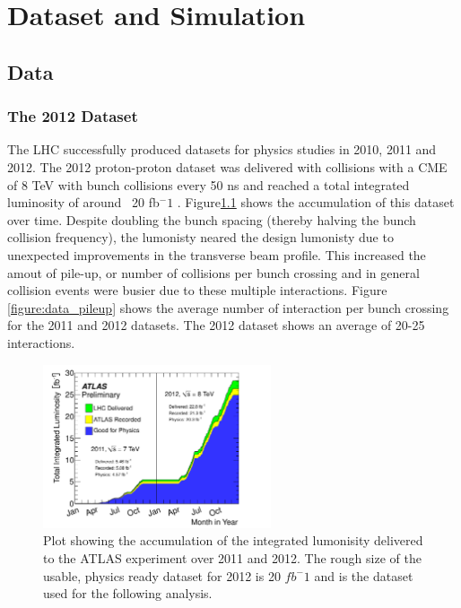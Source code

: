 \chapter[Dataset and Simulation][Dataset and Simulation]{Dataset and Simulation}

\section{Data}

\subsection{The 2012 Dataset} 

The LHC successfully produced datasets for physics studies in 2010, 2011 and 2012. The 2012 
proton-proton dataset was delivered with collisions with a CME of 8 TeV with bunch collisions
every 50 ns and reached a total integrated luminosity of around ~20 fb$^-1$ \cite{Aad:2013ucp}.
Figure\ref{figure:data_lumi} shows the accumulation of this dataset over time. 
Despite doubling the bunch spacing (thereby halving the bunch collision frequency), the lumonisty neared
the design lumonisty due to unexpected improvements in the transverse beam profile\cite{Carli:1424362}. This increased
the amout of pile-up, or number of collisions per bunch crossing and in general collision
events were busier due to these multiple interactions. Figure \ref{figure:data_pileup} shows
the average number of interaction per bunch crossing for the 2011 and 2012 datasets. The 2012
dataset shows an average of 20-25 interactions. 
\begin{figure}[!t]
\centering 
\includegraphics[width=0.60\textwidth]{figs/intlumivstime2011-2012DQ.pdf}
\caption{ Plot showing the accumulation of the integrated lumonisity delivered to the ATLAS experiment over 2011 and 2012. The rough size of the usable, physics ready dataset for 2012 is 20 $fb^-1$ and is the dataset used for the following analysis. 
}
\label{figure:data_lumi}
\end{figure}


